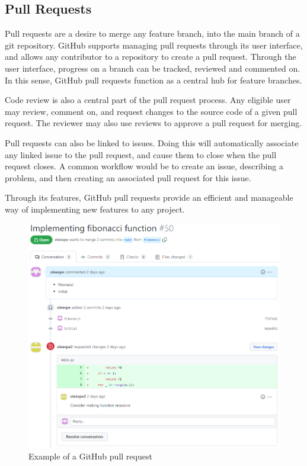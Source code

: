 \subsection{Pull Requests}

Pull requests are a desire to merge any feature branch, into the main branch of a git repository.
GitHub supports managing pull requests through its user interface, and allows any contributor to a repository to create a pull request.
Through the user interface, progress on a branch can be tracked, reviewed and commented on.
In this sense, GitHub pull requests function as a central hub for feature branches.

Code review is also a central part of the pull request process.
Any eligible user may review, comment on, and request changes to the source code of a given pull request.
The reviewer may also use reviews to approve a pull request for merging.

Pull requests can also be linked to issues.
Doing this will automatically associate any linked issue to the pull request, and cause them to close when the pull request closes.
A common workflow would be to create an issue, describing a problem, and then creating an associated pull request for this issue.

Through its features, GitHub pull requests provide an efficient and manageable way of implementing new features to any project.

\begin{figure}[ht]
    \centering
    \includegraphics[width=\textwidth]{photos/pull-request.PNG}
    \caption{Example of a GitHub pull request}
    \label{fig:pull-request}
\end{figure}

